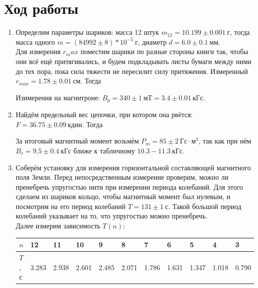 \documentclass[a4paper,12pt]{article}
\begin{document}
\section*{Ход работы}
\begin{enumerate}
\item Определим параметры шариков: масса 12 штук $m_{12} = 10.199\pm 0.001~\text{г}$, тогда масса одного $m = (84992 \pm 8)*10^{-5}~\text{г}$, диаметр $d = 6.0 \pm 0.1~\text{мм}$.\\
Для измерения $r_max$ поместим шарики по разные стороны книги так, чтобы они всё ещё притягивались, и будем подкладывать листы бумаги между ними до тех пора, пока сила тяжести не пересилит силу притяжения. Измеренный $r_{max} = 1.78 \pm 0.01~\text{см}$. Тогда 
\begin{center}
\end{center}
Изимерения на магнитроне: $B_p = 340 \pm 1~\text{мТ}=3.4 \pm 0.01~\text{кГс}.$
\item Найдём предельный вес цепочки, при котором она рвётся: $F = 36.75 \pm 0.09~\text{кдин}$. Тогда
\begin{center}
\end{center}
За итоговый магнитный момент возьмём $P_m =85 \pm 2 ~\text{Гс} \cdot \text{м}^3$, так как при нём $B_r = 9.5\pm 0.4~\text{кГс}$ ближе к табличному $10.3-11.3~\text{кГс}$.
\item Соберём установку для измерения горизонтальной составляющей магнитного поля Земли. Перед непосредственным измерение проверим, можно ли пренебречь упругостью нити при измерении периода колебаний. Для этого сделаем из шариков кольцо, чтобы магнитный момент был нулевым, и посмотрим на его период колебаний $T = 131 \pm 1~\text{с}$. Такой большой период колебаний указывает на то, что упругостью можно пренебречь.\\
Далее измерим зависимость $T(n)$:
\begin{table}[h]
\centering
\begin{tabular}{|l|l|l|l|l|l|l|l|l|l|l|}
\hline
$n$ & 12    & 11    & 10    & 9     & 8     & 7     & 6     & 5     & 4     & 3    \\ \hline
$T$, с & 3.283 & 2.938 & 2.601 & 2.485 & 2.071 & 1.786 & 1.631 & 1.347 & 1.018 & 0.790 \\ \hline
\end{tabular}
\end{table}

\end{enumerate}
\end{document}
